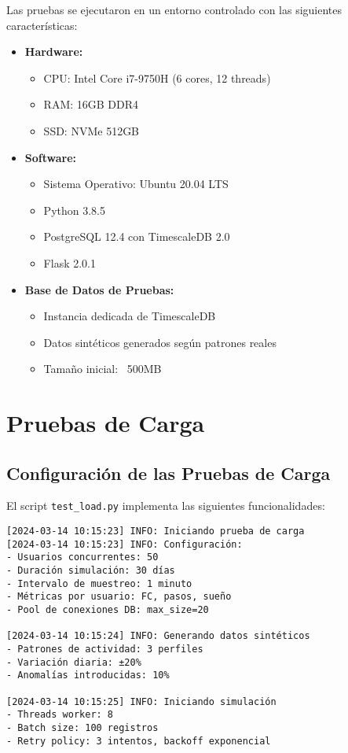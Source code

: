 Las pruebas se ejecutaron en un entorno controlado con las siguientes características:

\begin{itemize}
    \item \textbf{Hardware:}
        \begin{itemize}
            \item CPU: Intel Core i7-9750H (6 cores, 12 threads)
            \item RAM: 16GB DDR4
            \item SSD: NVMe 512GB
        \end{itemize}
    \item \textbf{Software:}
        \begin{itemize}
            \item Sistema Operativo: Ubuntu 20.04 LTS
            \item Python 3.8.5
            \item PostgreSQL 12.4 con TimescaleDB 2.0
            \item Flask 2.0.1
        \end{itemize}
    \item \textbf{Base de Datos de Pruebas:}
        \begin{itemize}
            \item Instancia dedicada de TimescaleDB
            \item Datos sintéticos generados según patrones reales
            \item Tamaño inicial: ~500MB
        \end{itemize}
\end{itemize}

\section{Pruebas de Carga}
\label{anexo:pruebas:carga}

\subsection{Configuración de las Pruebas de Carga}

El script \texttt{test\_load.py} implementa las siguientes funcionalidades:

\begin{verbatim}
[2024-03-14 10:15:23] INFO: Iniciando prueba de carga
[2024-03-14 10:15:23] INFO: Configuración:
- Usuarios concurrentes: 50
- Duración simulación: 30 días
- Intervalo de muestreo: 1 minuto
- Métricas por usuario: FC, pasos, sueño
- Pool de conexiones DB: max_size=20

[2024-03-14 10:15:24] INFO: Generando datos sintéticos
- Patrones de actividad: 3 perfiles
- Variación diaria: ±20%
- Anomalías introducidas: 10%

[2024-03-14 10:15:25] INFO: Iniciando simulación
- Threads worker: 8
- Batch size: 100 registros
- Retry policy: 3 intentos, backoff exponencial
\end{verbatim}

